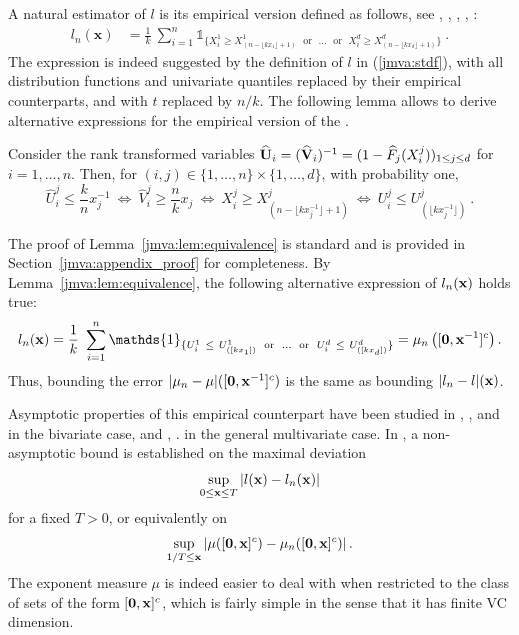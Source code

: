 A natural estimator of $l$ is its empirical version defined as
follows,  see \cite{Huangphd}, \cite{Qi97}, \cite{Drees98}, \cite{Einmahl2006}, \cite{COLT15}:
\begin{align}\label{jmva:empir-Stdf}
l_n(\mathbf{x}) &= \frac{1}{k}~\sum_{i=1}^{n} \mathds{1}_{\{ X_i^1 \ge
  X^1_{(n-\lfloor kx_1 \rfloor+1)}  \text{~~or~~} \ldots \text{~~or~~}
  X_i^d \ge  X^d_{(n-\lfloor kx_d\rfloor+1)}  \}}~.
\end{align}
The expression is indeed suggested by the definition of $l$ in  (\ref{jmva:stdf}), with all distribution functions and  univariate quantiles replaced by their empirical counterparts, and with $t$  replaced by $n/k$.
The following lemma allows to derive alternative expressions for the empirical version of the \stdf.  
\begin{lemma}
\label{jmva:lem:equivalence}
Consider the rank transformed variables 
$\mathbf{  \widehat U}_i = (\mathbf{ \widehat V}_i)^{-1} = ( 1- \widehat F_j
(X_i^j))_{1\leq j\leq d}$ for $i = 1, \ldots, n$. Then, for $(i,j)\in \{1,\ldots, n\}\times \{1,\ldots,d\}$,
with probability one,
$$
\widehat U_i^j \le \frac{k}{n} x_j^{-1} ~\Leftrightarrow~
\widehat V_i^j \ge \frac{n}{k} x_j ~\Leftrightarrow~
X_i^j \ge X_{(n-\lfloor  kx_j^{-1} \rfloor +1)}^j ~\Leftrightarrow~
U_i^j \le U_{(\lfloor kx_j^{-1}\rfloor)}^j~.
$$
\end{lemma}
The proof of Lemma~\ref{jmva:lem:equivalence} is standard and is provided in Section~\ref{jmva:appendix_proof} for completeness.
By Lemma~\ref{jmva:lem:equivalence}, the following alternative expression of $l_n(\mathbf x)$ holds true:
\begin{align}\label{jmva:empir-Stdf2}
l_n(\mb x)=\frac{1}{k} ~\sum_{i=1}^{n} \mathds{1}_{ \{U_i^1 ~\le~ U^1_{([kx_1])} \text{~~or~~} \ldots \text{~~or~~}  U_i^d ~\le~ U^d_{([kx_d])} \}}= \mu_n \left( [\mb 0, \mb x^{-1}]^c \right).
\end{align}
Thus, bounding the error $|\mu_n - \mu|([\mathbf 0,\mathbf x^{-1}]^c)$ is the same as
bounding $|l_n - l|(\mathbf x)$. 

Asymptotic properties of this empirical counterpart have been studied
in \cite{Huangphd}, \cite{Drees98}, \cite{Embrechts2000} and
\cite{dHF06} in the bivariate case, and \cite{Qi97},
\cite{Einmahl2012}. 
in the general multivariate
 case. 
In \cite{COLT15}, a non-asymptotic bound is established on the maximal deviation $$\sup_{0 \le \mathbf x \le T} |l(\mathbf x) - l_n(\mathbf x)|$$ for a fixed $T>0$, or equivalently on 
$$ \sup_{1/T \le \mathbf x } \left|\mu ( [\mathbf 0, \mathbf x]^c ) - \mu_n ( [\mathbf 0, \mathbf x]^c )\right|. $$
\noindent
The exponent measure $\mu$ is indeed easier to deal with when restricted to the class of sets of the form $[\mathbf 0, \mathbf x]^c$, which is fairly simple in the sense that it has finite VC dimension. %






